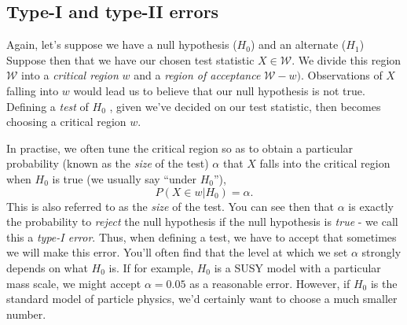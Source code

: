  \subsection{Type-I and type-II errors}
 Again, let's suppose we have a null hypothesis ($H_{0}$) and an alternate ($H_{1}$) Suppose then that we have our chosen test statistic $X\in \mathcal{W}$. We divide this region $\mathcal{W}$ into a \emph{critical region} ${w}$ and a \emph{region of acceptance} $\mathcal{W}-{w})$. Observations of $X$ falling into $w$ would lead us to believe that our null hypothesis is not true. Defining a \emph{test} of $H_{0}$ , given we've decided on our test statistic, then becomes choosing a critical region $w$. 
 
In practise, we often tune the critical region so as to obtain a particular probability (known as the \emph{size} of the test) $\alpha$ that $X$ falls into the critical region when $H_0$ is true (we usually say ``under $H_0$''), 
\begin{equation}\label{eqn:testsize}
     P(X\in w|H_{0})=\alpha.
\end{equation}
This is also referred to as the \emph{size} of the test. 
You can see then that $\alpha$ is exactly the probability to \emph{reject} the null hypothesis if the null hypothesis is \emph{true} - we call this a \emph{type-I error}. Thus, when defining a test, we have to accept that sometimes we will make this error. You'll often find that the level at which we set $\alpha$ strongly depends on what $H_0$ is. If for example, $H_0$ is a SUSY model with a particular mass scale, we might accept $\alpha=0.05$ as a reasonable error. However, if $H_0$ is the standard model of particle physics, we'd certainly want to choose a much smaller number. 

